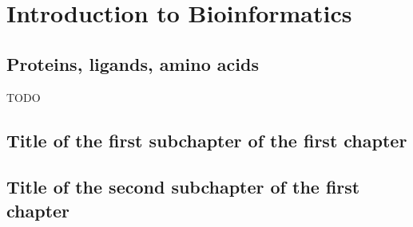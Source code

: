 \chapter{Introduction to Bioinformatics}
\label{chap:intro}

\section{Proteins, ligands, amino acids}
\label{sec:prot}

TODO

\section{Title of the first subchapter of the first chapter}

\section{Title of the second subchapter of the first chapter}
